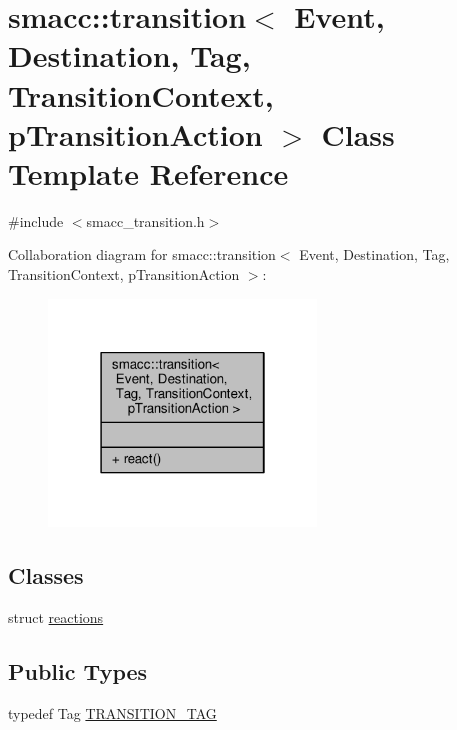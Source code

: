 \hypertarget{classsmacc_1_1transition}{}\section{smacc\+:\+:transition$<$ Event, Destination, Tag, Transition\+Context, p\+Transition\+Action $>$ Class Template Reference}
\label{classsmacc_1_1transition}


{\ttfamily \#include $<$smacc\+\_\+transition.\+h$>$}



Collaboration diagram for smacc\+:\+:transition$<$ Event, Destination, Tag, Transition\+Context, p\+Transition\+Action $>$\+:
\nopagebreak
\begin{figure}[H]
\begin{center}
\leavevmode
\includegraphics[width=202pt]{classsmacc_1_1transition__coll__graph}
\end{center}
\end{figure}
\subsection*{Classes}
\begin{DoxyCompactItemize}
\item 
struct \hyperlink{structsmacc_1_1transition_1_1reactions}{reactions}
\end{DoxyCompactItemize}
\subsection*{Public Types}
\begin{DoxyCompactItemize}
\item 
typedef Tag \hyperlink{classsmacc_1_1transition_a54c8023d8bdcdddfb18c3f5b7a9d2e32}{T\+R\+A\+N\+S\+I\+T\+I\+O\+N\+\_\+\+T\+AG}
\end{DoxyCompactItemize}
